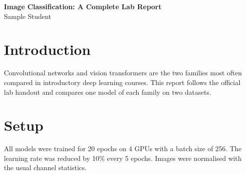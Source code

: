 \documentclass[11pt]{article}
\begin{document}
\begin{center}{\Large\bfseries Image Classification: A Complete Lab Report}\\[4pt]Sample Student\end{center}
\section{Introduction}
Convolutional networks and vision transformers are the two families most often compared in
introductory deep learning courses. This report follows the official lab handout and compares one
model of each family on two datasets.
\section{Setup}
All models were trained for 20 epochs on 4 GPUs with a batch size of 256. The learning rate was reduced by 10\% every 5 epochs. Images were normalised with the usual channel statistics.
\end{document}
